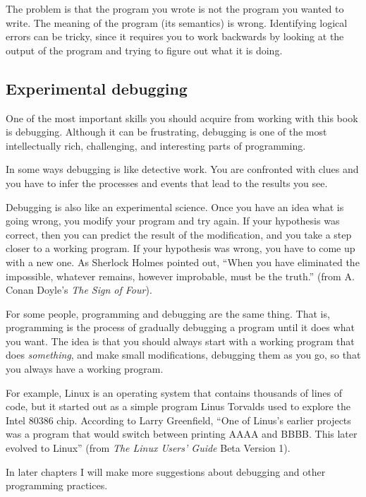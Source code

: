 The problem is that the program you wrote is not the program
you wanted to write.  The meaning of the program (its semantics)
is wrong.  Identifying logical errors can be tricky, since
it requires you to work backwards by looking at the output
of the program and trying to figure out what it is doing.

\subsection{Experimental debugging}

One of the most important skills you should acquire from working with
this book is debugging.  Although it can be frustrating, debugging is
one of the most intellectually rich, challenging, and interesting
parts of programming.

In some ways debugging is like detective work.  You are
confronted with clues and you have to infer the processes
and events that lead to the results you see.

Debugging is also like an experimental science.  Once you have an idea
what is going wrong, you modify your program and try again.  If your
hypothesis was correct, then you can predict the result of the
modification, and you take a step closer to a working program.  If
your hypothesis was wrong, you have to come up with a new one.  As
Sherlock Holmes pointed out, ``When you have eliminated the
impossible, whatever remains, however improbable, must be the truth.''
(from A. Conan Doyle's {\em The Sign of Four}).


For some people, programming and debugging are the
same thing.  That is, programming is the process of gradually
debugging a program until it does what you want.  The idea
is that you should always start with a working program that
does {\em something}, and make small modifications, debugging
them as you go, so that you always have a working program.

For example, Linux is an operating system that contains thousands of
lines of code, but it started out as a simple program Linus Torvalds
used to explore the Intel 80386 chip.  According to Larry Greenfield,
``One of Linus's earlier projects was a program that would switch
between printing AAAA and BBBB.  This later evolved to Linux''
(from {\em The Linux Users' Guide} Beta Version 1).


In later chapters I will make more suggestions about debugging
and other programming practices.

